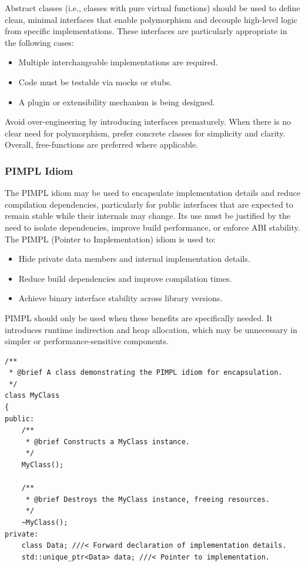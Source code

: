 Abstract classes (i.e., classes with pure virtual functions) should be used to define clean, minimal interfaces that enable polymorphism and decouple high-level logic from specific implementations. These interfaces are particularly appropriate in the following cases:
\begin{itemize}\itemsep0em
    \item Multiple interchangeable implementations are required.
    \item Code must be testable via mocks or stubs.
    \item A plugin or extensibility mechanism is being designed.
\end{itemize}
Avoid over-engineering by introducing interfaces prematurely. When there is no clear need for polymorphism, prefer concrete classes for simplicity and clarity. Overall, free-functions are preferred where applicable.

\subsubsection*{PIMPL Idiom}

The PIMPL idiom may be used to encapsulate implementation details and reduce compilation dependencies, particularly for public interfaces that are expected to remain stable while their internals may change. Its use must be justified by the need to isolate dependencies, improve build performance, or enforce ABI stability. The PIMPL (Pointer to Implementation) idiom is used to:
\begin{itemize}\itemsep0em
    \item Hide private data members and internal implementation details.
    \item Reduce build dependencies and improve compilation times.
    \item Achieve binary interface stability across library versions.
\end{itemize}

PIMPL should only be used when these benefits are specifically needed. It introduces runtime indirection and heap allocation, which may be unnecessary in simpler or performance-sensitive components.
\begin{lstlisting}[style=cppstyle]
/**
 * @brief A class demonstrating the PIMPL idiom for encapsulation.
 */
class MyClass 
{
public:
    /**
     * @brief Constructs a MyClass instance.
     */
    MyClass();
    
    /**
     * @brief Destroys the MyClass instance, freeing resources.
     */
    ~MyClass();
private:
    class Data; ///< Forward declaration of implementation details.
    std::unique_ptr<Data> data; ///< Pointer to implementation.
\end{lstlisting}

